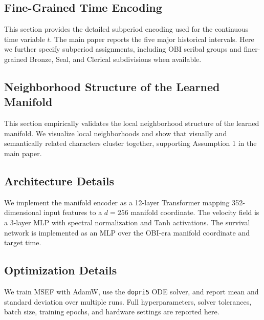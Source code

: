 \documentclass{article}
\begin{document}

\subsection{Fine-Grained Time Encoding}
\label{app:time_summary}

This section provides the detailed subperiod encoding used for the continuous time variable $t$. 
The main paper reports the five major historical intervals. Here we further specify subperiod assignments, including OBI scribal groups and finer-grained Bronze, Seal, and Clerical subdivisions when available.


\subsection{Neighborhood Structure of the Learned Manifold}
\label{app:neighborhood_summary}

This section empirically validates the local neighborhood structure of the learned manifold. 
We visualize local neighborhoods and show that visually and semantically related characters cluster together, supporting Assumption 1 in the main paper.


\subsection{Architecture Details}
\label{app:architecture_details}

We implement the manifold encoder as a 12-layer Transformer mapping 352-dimensional input features to a $d=256$ manifold coordinate. 
The velocity field is a 3-layer MLP with spectral normalization and Tanh activations. 
The survival network is implemented as an MLP over the OBI-era manifold coordinate and target time.


\subsection{Optimization Details}
\label{app:optimization_details}

We train MSEF with AdamW, use the \texttt{dopri5} ODE solver, and report mean and standard deviation over multiple runs. 
Full hyperparameters, solver tolerances, batch size, training epochs, and hardware settings are reported here.
\end{document}
